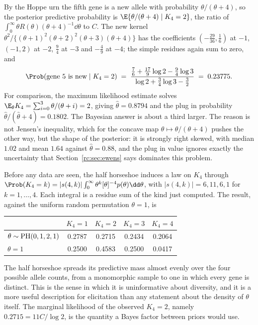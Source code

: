 \begin{example}\label{rc:ex:pred}
By the Hoppe urn the fifth gene is a new allele with probability $\theta/(\theta+4)$, so the posterior predictive probability is $\E\{\theta/(\theta+4)\mid K_4=2\}$, the ratio of $\int_0^\infty\theta R(\theta)(\theta+4)^{-1}\dd\theta$ to $C$. The new kernel $\theta^2/\{(\theta+1)^2(\theta+2)^2(\theta+3)(\theta+4)\}$ has the coefficients $(-\frac{29}{36},\frac16)$ at $-1$, $(-1,2)$ at $-2$, $\frac94$ at $-3$ and $-\frac49$ at $-4$; the simple residues again sum to zero, and
\[
\Prob(\text{gene 5 is new}\mid K_4=2)\;=\;\frac{\frac76+\frac{17}9\log2-\frac94\log3}{\log2+\frac34\log3-\frac32}\;=\;0.23775.
\]
For comparison, the maximum likelihood estimate solves $\E_\theta K_4=\sum_{i=0}^3\theta/(\theta+i)=2$, giving $\hat\theta=0.8794$ and the plug in probability $\hat\theta/(\hat\theta+4)=0.1802$. The Bayesian answer is about a third larger. The reason is not Jensen's inequality, which for the concave map $\theta\mapsto\theta/(\theta+4)$ pushes the other way, but the shape of the posterior: it is strongly right skewed, with median $1.02$ and mean $1.64$ against $\hat\theta=0.88$, and the plug in value ignores exactly the uncertainty that Section~\ref{rc:sec:ewens} says dominates this problem.
\end{example}

\begin{example}\label{rc:ex:priorpred}
Before any data are seen, the half horseshoe induces a law on $K_4$ through $\Prob(K_4=k)=|s(4,k)|\int_0^\infty\theta^k[\theta]^{-4}p(\theta)\dd\theta$, with $|s(4,k)|=6,11,6,1$ for $k=1,\dots,4$. Each integral is a residue sum of the kind just computed. The result, against the uniform random permutation $\theta=1$, is
\begin{center}
\small
\begin{tabular}{@{}lcccc@{}}
\toprule
 & $K_4=1$ & $K_4=2$ & $K_4=3$ & $K_4=4$\\
\midrule
$\theta\sim\mathrm{PH}(0,1,2,1)$ & 0.2787 & 0.2715 & 0.2434 & 0.2064\\
$\theta=1$ & 0.2500 & 0.4583 & 0.2500 & 0.0417\\
\bottomrule
\end{tabular}
\end{center}
The half horseshoe spreads its predictive mass almost evenly over the four possible allele counts, from a monomorphic sample to one in which every gene is distinct. This is the sense in which it is uninformative about diversity, and it is a more useful description for elicitation than any statement about the density of $\theta$ itself. The marginal likelihood of the observed $K_4=2$, namely $0.2715=11C/\log2$, is the quantity a Bayes factor between priors would use.
\end{example}

